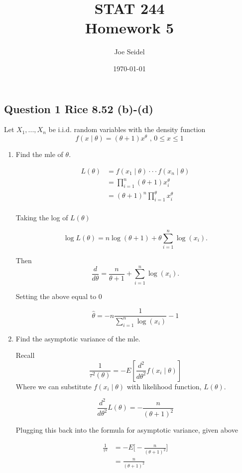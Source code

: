 \documentclass{tufte-book}
\title{STAT 244 \\ Homework 5}
\author{Joe Seidel}
\date{\today}
\theoremstyle{mytheoremstyle}
\theoremstyle{mylemstyle}
\theoremstyle{mydefstyle}
\begin{document}
\maketitle
{}
\newpage
{}

\subsection{Question 1 Rice 8.52 (b)-(d)}
Let $X_1,...,X_n$ be i.i.d. random variables with the density function
\[ f(x\mid \theta) = (\theta + 1)x^\theta \text{ , } 0\leq x \leq 1 \]

\begin{enumerate}

\item Find the mle of $\theta$.

\begin{align*}
L(\theta) &= f(x_1 \mid \theta) \cdot \cdot \cdot f(x_n \mid \theta)\\
&= \prod_{i=1}^n (\theta + 1)x_i^\theta\\
&= (\theta+1)^n \prod_{i=1}^\theta x_i^\theta\\
\end{align*}

Taking the log of $L(\theta)$

\[ \log L(\theta) = n \log(\theta+1) + \theta \sum_{i=1}^n \log(x_i). \]

Then
\[ \frac{d}{d\theta} = \frac{n}{\theta+1} + \sum_{i=1}^n \log(x_i). \]

Setting the above equal to $0$ 

\[ \hat{\theta} = -n \frac{1}{\sum_{i=1}^n \log(x_i)} -1 \]

\item Find the asymptotic variance of the mle.

Recall
\[ \frac{1}{\tau^2(\theta)} = -E[\frac{d^2}{d\theta^2} f(x_i\mid\theta)] \]
Where we can substitute $f(x_i\mid \theta)$ with likelihood function, $L(\theta)$. 

\[ \frac{d^2}{d\theta^2}L(\theta) = -\frac{n}{(\theta +1)^2} \]

Plugging this back into the formula for asymptotic variance, given above

\begin{align*}
\frac{1}{\tau^2} &= -E\Big[-\frac{n}{(\theta +1)^2}\Big]\\
&= \frac{n}{(\theta+1)^2}\\
\end{align*}


\end{enumerate}
\end{document}
